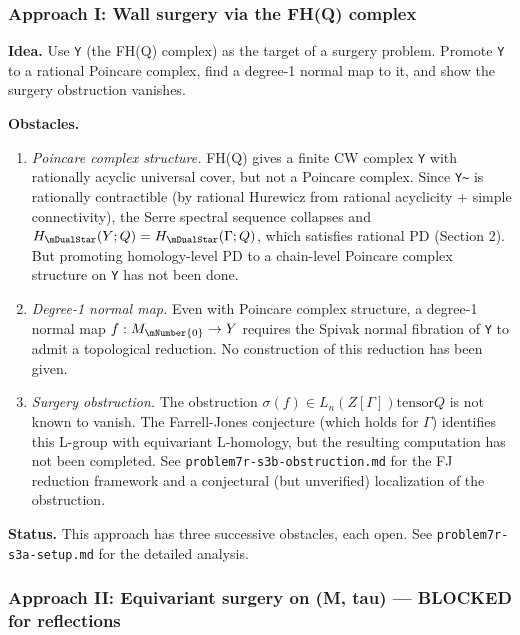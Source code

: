 \hypertarget{approach-i-wall-surgery-via-the-fhq-complex}{%
\subsubsection{Approach I: Wall surgery via the FH(Q) complex}\label{approach-i-wall-surgery-via-the-fhq-complex}}

\textbf{Idea.} Use \texttt{Y} (the FH(Q) complex) as the target of a surgery problem.
Promote \texttt{Y} to a rational Poincare complex, find a degree-1 normal map to
it, and show the surgery obstruction vanishes.

\textbf{Obstacles.}

\begin{enumerate}
\def\labelenumi{\arabic{enumi}.}
\item
  \emph{Poincare complex structure.} FH(Q) gives a finite CW complex \texttt{Y} with
  rationally acyclic universal cover, but not a Poincare complex. Since
  \texttt{Y\textasciitilde{}} is rationally contractible (by rational Hurewicz from rational
  acyclicity + simple connectivity), the Serre spectral sequence collapses
  and \(H_{\mDualStar}(Y; Q) = H_{\mDualStar}(\Gamma; Q)\), which satisfies rational PD
  (Section 2). But promoting homology-level PD to a chain-level Poincare
  complex structure on \texttt{Y} has not been done.
\item
  \emph{Degree-1 normal map.} Even with Poincare complex structure, a degree-1
  normal map \(f: M_\mNumber{0} \to Y\) requires the Spivak normal fibration of \texttt{Y} to
  admit a topological reduction. No construction of this reduction has been
  given.
\item
  \emph{Surgery obstruction.} The obstruction \(\sigma(f) \in L_{n}(Z[\Gamma]) \text{tensor} Q\)
  is not known to vanish. The Farrell-Jones conjecture (which holds for
  \(\Gamma\)) identifies this L-group with equivariant L-homology, but the
  resulting computation has not been completed. See \texttt{problem7r-s3b-obstruction.md}
  for the FJ reduction framework and a conjectural (but unverified)
  localization of the obstruction.
\end{enumerate}

\textbf{Status.} This approach has three successive obstacles, each open.
See \texttt{problem7r-s3a-setup.md} for the detailed analysis.

\hypertarget{approach-ii-equivariant-surgery-on-m-tau--blocked-for-reflections}{%
\subsubsection{Approach II: Equivariant surgery on (M, tau) --- BLOCKED for reflections}\label{approach-ii-equivariant-surgery-on-m-tau--blocked-for-reflections}}

